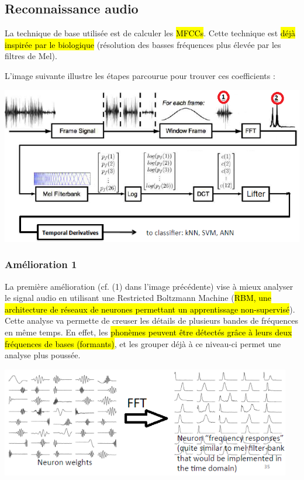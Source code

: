 \documentclass[letterpaper, 12pt]{article}
\newcommand{\alinea}{
\hspace*{0.5cm}}
\begin{document}
		\subsection{Reconnaissance audio}
			\alinea La technique de base utilisée est de calculer les \hl{MFCCs}. Cette technique est \hl{déjà inspirée par le biologique}
				(résolution des basses fréquences plus élevée par les filtres de Mel).
				
				
				L'image suivante illustre les étapes
				parcourue pour trouver ces coefficients : 
			\begin{center}
				\includegraphics[width=6in]{Images/mfcc}
			\end{center}
			\subsubsection{Amélioration 1}
				\alinea La première amélioration (cf. (1) dans l'image précédente) vise à mieux analyser le signal audio en utilisant 
					une Restricted Boltzmann Machine (\hl{RBM,
					une architecture de réseaux de neurones permettant un apprentissage non-supervisé}). Cette analyse va permette
					de creuser les détails de plusieurs bandes de fréquences en même temps. En effet, les \hl{phonèmes peuvent être
					détectés grâce à leurs deux fréquences de bases (formants)}, et les grouper déjà à ce niveau-ci permet une 
					analyse plus poussée.
				\begin{center}
					\includegraphics[width=5in]{Images/rbm}
				\end{center}
\end{document}
